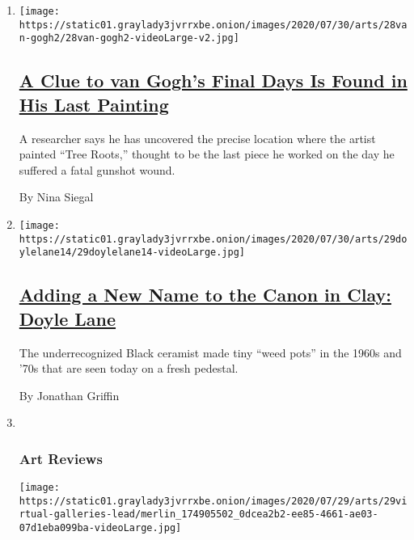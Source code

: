 \begin{enumerate}
\def\labelenumi{\arabic{enumi}.}
\item
  \texttt{[image: https://static01.graylady3jvrrxbe.onion/images/2020/07/30/arts/28van-gogh2/28van-gogh2-videoLarge-v2.jpg]}

  \hypertarget{a-clue-to-van-goghs-final-days-is-found-in-his-last-painting}{%
  \subsection{\texorpdfstring{\href{/2020/07/28/arts/design/vincent-van-gogh-tree-roots.html}{A
  Clue to van Gogh's Final Days Is Found in His Last
  Painting}}{A Clue to van Gogh's Final Days Is Found in His Last Painting}}\label{a-clue-to-van-goghs-final-days-is-found-in-his-last-painting}}

  A researcher says he has uncovered the precise location where the
  artist painted ``Tree Roots,'' thought to be the last piece he worked
  on the day he suffered a fatal gunshot wound.

  By Nina Siegal
\item
  \texttt{[image: https://static01.graylady3jvrrxbe.onion/images/2020/07/30/arts/29doylelane14/29doylelane14-videoLarge.jpg]}

  \hypertarget{adding-a-new-name-to-the-canon-in-clay-doyle-lane}{%
  \subsection{\texorpdfstring{\href{/2020/07/29/arts/design/doyle-lane-ceramics.html}{Adding
  a New Name to the Canon in Clay: Doyle
  Lane}}{Adding a New Name to the Canon in Clay: Doyle Lane}}\label{adding-a-new-name-to-the-canon-in-clay-doyle-lane}}

  The underrecognized Black ceramist made tiny ``weed pots'' in the
  1960s and '70s that are seen today on a fresh pedestal.

  By Jonathan Griffin
\item ~
  \hypertarget{art-reviews}{%
  \subsubsection{Art Reviews}\label{art-reviews}}

  \texttt{[image: https://static01.graylady3jvrrxbe.onion/images/2020/07/29/arts/29virtual-galleries-lead/merlin\_174905502\_0dcea2b2-ee85-4661-ae03-07d1eba099ba-videoLarge.jpg]}

  \hypertarget{three-art-gallery-shows-to-see-right-now}{%
}
\end{enumerate}
